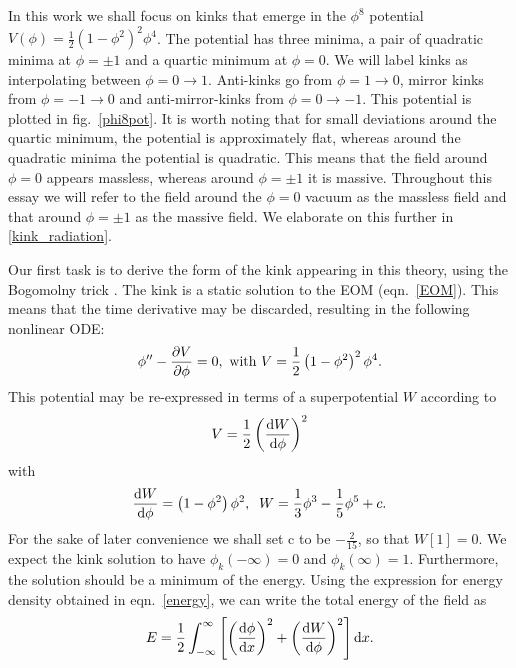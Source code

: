 \documentclass[11pt, oneside,titlepage]{article}  	%
\numberwithin{equation}{section}
\newcommand{\drv}{\ensuremath{\textup{d}}}
\begin{document}
 In this work we shall focus on kinks that emerge in the $\phi^8$ potential $V(\phi) = \frac{1}{2} \left ( 1 - \phi^2\right)^2 \phi^4$. The potential has three minima, a pair of quadratic minima at $\phi = \pm1$ and a quartic minimum at $\phi= 0$. We will label kinks as interpolating between $\phi = 0 \rightarrow 1$. Anti-kinks go from $\phi = 1 \rightarrow 0$, mirror kinks from $\phi = -1 \rightarrow 0$ and anti-mirror-kinks from $\phi = 0\rightarrow -1$. This potential is plotted in fig.~\ref{phi8pot}. It is worth noting that for small deviations around the quartic minimum, the potential is approximately flat, whereas around the quadratic minima the potential is quadratic. This means that the field around $\phi = 0$ appears massless, whereas around $\phi = \pm1$ it is massive. Throughout this essay we will refer to the field around the $\phi = 0$ vacuum as the massless field and that around $\phi = \pm1$ as the massive field. We elaborate on this further in \textsection \ref{kink_radiation}.\par
 Our first task is to derive the form of the kink appearing in this theory, using the Bogomolny trick \cite{bogomolny}. The kink is a static solution to the EOM (eqn.~\ref{EOM}). This means that the time derivative may be discarded, resulting in the following nonlinear ODE:
 \begin{equation} \label{kink_equation}
 {\phi}'' - \frac{\partial V}{\partial \phi} = 0, \textup{ with } V = \frac{1}{2} \left ( 1 - \phi^2\right)^2 \phi^4.
 \end{equation}
 This potential may be re-expressed in terms of a superpotential $W$ according to
 \begin{equation}
 V = \frac{1}{2} \left ( \frac{\textup{d}W}{\textup{d}\phi}\right )^2
 \end{equation}
 with
 \begin{equation}\label{dw}
 \frac{\textup{d}W}{\textup{d}\phi} = \left ( 1 - \phi^2 \right ) \phi^2 ,\; \;W = \frac{1}{3}\phi^3 - \frac{1}{5}\phi^5 +c.
 \end{equation}
For the sake of later convenience we shall set c to be $-\frac{2}{15}$, so that $W[1]=0$. We expect the kink solution to have $\phi_k (-\infty )= 0$ and $\phi_k (\infty )= 1$. Furthermore, the solution should be a minimum of the energy. Using the expression for energy density obtained in eqn.~\ref{energy}, we can write the total energy of the field as
 \begin{equation}\label{EW}
E = \frac{1}{2} \int_{-\infty}^{\infty} \left [ \left(\frac{\textup{d}\phi}{\textup{d}x}\right)^2 + \left(\frac{\textup{d}W}{\textup{d}\phi}\right)^2 \right ]\drv x.
 \end{equation}
\end{document}
